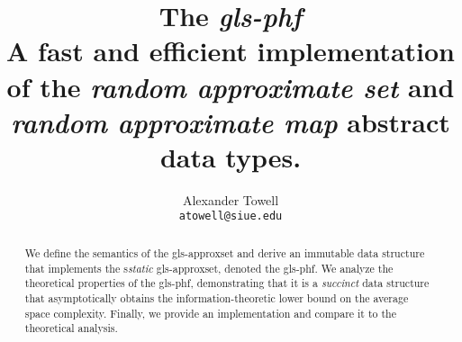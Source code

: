 \documentclass[11pt,final,hidelinks]{article}
\title
{
    The \emph{\gls*{gls-phf}}\\
    \large A fast and efficient implementation of the \emph{random approximate set} and \emph{random approximate map} abstract data types.
}
\author
{
    Alexander Towell\\
    \texttt{atowell@siue.edu}
}
\date{}
\begin{document}
\maketitle
\begin{abstract}
We define the semantics of the \gls*{gls-approxset} and derive an immutable data structure that implements the s\emph{static} \gls*{gls-approxset}, denoted the \gls*{gls-phf}. We analyze the theoretical properties of the \gls*{gls-phf}, demonstrating that it is a \emph{succinct} data structure that asymptotically obtains the information-theoretic lower bound on the average space complexity. Finally, we provide an implementation and compare it to the theoretical analysis.
\end{abstract}

\tableofcontents



%



%
%

\printglossary

\end{document}

